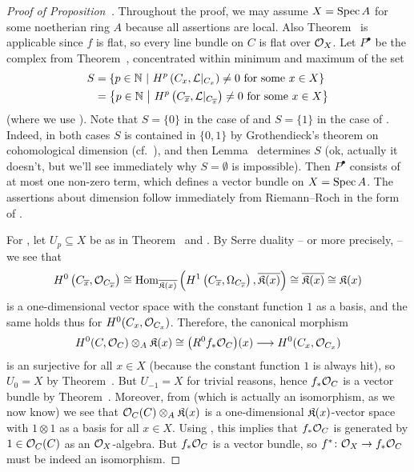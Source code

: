 \documentclass[a4paper,parskip=half,numbers=enddot, DIV=12]{scrreprt}
\begin{document}
\begin{proof}[Proof of Proposition~]
	Throughout the proof, we may assume $X=\operatorname{Spec} A$ for some noetherian ring $A$ because all assertions are local. Also Theorem~ is applicable since $f$ is flat, so every line bundle on $C$ is flat over $\mathcal{O}_X$. Let $P^\bullet$ be the complex from Theorem~, concentrated within minimum and maximum of the set
	\begin{align*}
		S&=\left\{p\in\mathbb{N}\ \middle|\  H^p\left(C_x,\mathcal{L}|_{C_x}\right)\neq 0\text{ for some }x\in X\right\}\\
		&=\left\{p\in\mathbb{N}\ \middle|\  H^p\left(C_{\overline{x}},\mathcal{L}|_{C_{\overline{x}}}\right)\neq 0\text{ for some }x\in X\right\}
	\end{align*}
	(where we use ). Note that $S=\{0\}$ in the case of  and $S=\{1\}$ in the case of . Indeed, in both cases $S$ is contained in $\{0,1\}$ by Grothendieck's theorem on cohomological dimension (cf.\ \cite[Proposition~1.4.1]{alggeo2}), and then Lemma~ determines $S$ (ok, actually it doesn't, but we'll see immediately why $S=\emptyset$ is impossible). Then $P^\bullet$ consists of at most one non-zero term, which defines a vector bundle on $X=\operatorname{Spec} A$. The assertions about dimension follow immediately from Riemann--Roch in the form of \cite[equation~(3.1.3)]{alggeo2}.
	
	For , let $U_p\subseteq X$ be as in Theorem~ and . By Serre duality -- or more precisely, \cite[Theorem~7 and ]{alggeo2} -- we see that
	\begin{align*}
		H^0\left(C_{\overline{x}},\mathcal{O}_{C_{\overline{x}}}\right)\cong \operatorname{Hom}_{\overline{\mathfrak{K}(x)}}\left(H^1\left(C_{\overline{x}},\Omega_{C_{\overline{c}}}\right),\overline{\mathfrak{K}(x)}\right)\cong\overline{\mathfrak{K}(x)}\cong \mathfrak{K}(x)
	\end{align*}
	is a one-dimensional vector space with the constant function $1$ as a basis, and the same holds thus for $H^0(C_x,\mathcal{O}_{C_x})$. Therefore, the canonical morphism
	\begin{align}\lbl{eq:H0OC}
		H^0(C,\Oo_C)\otimes_A\KK(x)\cong\big(R^0f_*\Oo_C\big)(x)\morphism H^0(C_x,\Oo_{C_x})
	\end{align}
	is an surjective for all $x\in X$ (because the constant function $1$ is always hit), so $U_0=X$ by Theorem~. But $U_{-1}=X$ for trivial reasons, hence $f_*\mathcal{O}_C$ is a vector bundle by Theorem~. Moreover, from  (which is actually an isomorphism, as we now know) we see that $\mathcal{O}_C(C)\otimes_A\mathfrak{K}(x)$ is a one-dimensional $\mathfrak{K}(x)$-vector space with $1\otimes 1$ as a basis for all $x\in X$. Using \cite[Lemma~1.5.1]{alg2}, this implies that $f_*\mathcal{O}_C$ is generated by $1\in\mathcal{O}_C(C)$ as an $\mathcal{O}_X$-algebra. But $f_*\mathcal{O}_C$ is a vector bundle, so $f^*\colon \Oo_X\morphism f_*\Oo_C$ must be indeed an isomorphism.
	

\end{proof}
\end{document}
